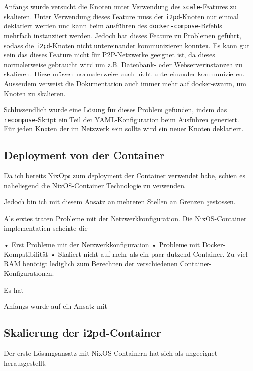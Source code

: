 Anfangs wurde versucht die Knoten unter Verwendung des \lstinline|scale|-Features zu skalieren.
Unter Verwendung dieses Feature muss der \lstinline|i2pd|-Knoten nur einmal deklariert werden und kann beim ausführen des \lstinline|docker-compose|-Befehls mehrfach instanziiert werden.
Jedoch hat dieses Feature zu Problemen geführt, sodass die \lstinline|i2pd|-Knoten nicht untereinander kommunizieren konnten.
Es kann gut sein das dieses Feature nicht für P2P-Netzwerke geeignet ist, da dieses normalerweise gebraucht wird um z.B. Datenbank- oder Webserverinstanzen zu skalieren.
Diese müssen normalerweise auch nicht untereinander kommunizieren.
Ausserdem verweist die Dokumentation auch immer mehr auf docker-swarm, um Knoten zu skalieren.

Schlussendlich wurde eine Lösung für dieses Problem gefunden,
indem das \lstinline|recompose|-Skript ein Teil der YAML-Konfiguration beim Ausführen generiert.
Für jeden Knoten der im Netzwerk sein sollte wird ein neuer Knoten deklariert.


\subsection{Deployment von der Container}

Da ich bereits NixOps zum deployment der Container verwendet habe, schien es naheliegend die NixOS-Container Technologie zu verwenden.

Jedoch bin ich mit diesem Ansatz an mehreren Stellen an Grenzen gestossen.

Als erstes traten Probleme mit der Netzwerkkonfiguration. Die NixOS-Container implementation scheinte die 

• Erst Probleme mit der Netzwerkkonfiguration
• Probleme mit Docker-Kompatibilität
• Skaliert nicht auf mehr als ein paar dutzend Container. Zu viel
RAM benötigt lediglich zum Berechnen der verschiedenen
Container-Konfigurationen.

Es hat 

Anfangs wurde auf ein Ansatz mit 


\subsection{Skalierung der i2pd-Container}

Der erste Lösungsansatz mit NixOS-Containern hat sich als ungeeignet herausgestellt. 

